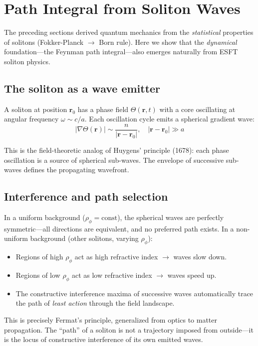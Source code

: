 ﻿\documentclass[twocolumn,showpacs,preprintnumbers,amsmath,amssymb,prd]{revtex4-2}
\begin{document}
\section{Path Integral from Soliton Waves}

The preceding sections derived quantum mechanics from the \emph{statistical} properties of solitons (Fokker-Planck $\to$ Born rule). Here we show that the \emph{dynamical} foundation---the Feynman path integral---also emerges naturally from ESFT soliton physics.

\subsection{The soliton as a wave emitter}

A soliton at position $\mathbf{r}_0$ has a phase field $\Theta(\mathbf{r}, t)$ with a core oscillating at angular frequency $\omega \sim c/a$. Each oscillation cycle emits a spherical gradient wave:
\begin{equation}
|\nabla\Theta(\mathbf{r})| \sim \frac{n}{|\mathbf{r} - \mathbf{r}_0|}, \quad |\mathbf{r} - \mathbf{r}_0| \gg a
\end{equation}

This is the field-theoretic analog of Huygens' principle (1678): each phase oscillation is a source of spherical sub-waves. The envelope of successive sub-waves defines the propagating wavefront.

\subsection{Interference and path selection}

In a uniform background ($\rho_\phi = \text{const}$), the spherical waves are perfectly symmetric---all directions are equivalent, and no preferred path exists. In a non-uniform background (other solitons, varying $\rho_\phi$):
\begin{itemize}
\item Regions of high $\rho_\phi$ act as high refractive index $\to$ waves slow down.
\item Regions of low $\rho_\phi$ act as low refractive index $\to$ waves speed up.
\item The constructive interference maxima of successive waves automatically trace the path of \emph{least action} through the field landscape.
\end{itemize}

This is precisely Fermat's principle, generalized from optics to matter propagation. The ``path'' of a soliton is not a trajectory imposed from outside---it is the locus of constructive interference of its own emitted waves.
\end{document}
